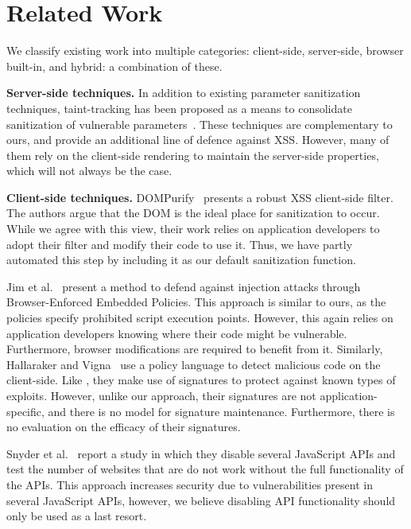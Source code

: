 \section{Related Work}
We classify existing work into multiple categories: client-side, server-side, browser built-in, and hybrid: a combination of these.

\noindent \textbf{Server-side techniques.}
In addition to existing parameter sanitization techniques,
taint-tracking has been proposed as a means to consolidate
sanitization of vulnerable parameters~\cite{Xu:2006:TPE:1267336.1267345,DBLP:conf/sec/Nguyen-TuongGGSE05,Pietraszek:2005:DAI:2146257.2146267,Bisht:2008:XPD:1428322.1428325}. These
techniques are complementary to ours, and provide an additional line
of defence against \ac{XSS}. However, many of them rely on the
client-side rendering to maintain the server-side properties, which
will not always be the case.

\noindent \textbf{Client-side techniques.}
DOMPurify~\cite{10.1007/978-3-319-66399-9_7} presents a robust
\ac{XSS} client-side filter. The authors
argue that the DOM is the ideal place for sanitization to occur. While
we agree with this view, their work relies on application developers
to adopt their filter and modify their code to use it. Thus, we have partly automated this step by including it as our default sanitization function.

Jim et al.~\cite{Jim:2007:DSI:1242572.1242654} present a method to
defend against injection attacks through Browser-Enforced Embedded
Policies. This approach is similar to ours, as the policies specify
prohibited script execution points. However, this again relies on application developers knowing where their code might be vulnerable. Furthermore, browser modifications are required to benefit from it. Similarly, Hallaraker and Vigna~\cite{Hallaraker:2005:DMJ:1078029.1078861} use a
policy language to detect malicious code on the client-side. Like \sys, they make use of signatures to protect against known types of
exploits. However, unlike our approach, their signatures are not
application-specific, and there is no model for signature
maintenance. Furthermore, there is no evaluation on the efficacy of
their signatures.

Snyder et al.~\cite{Snyder:2017:MWD:3133956.3133966} report a study in which
they disable several JavaScript APIs and test the number of websites
that are do not work without the full functionality of the APIs. This approach increases security due to vulnerabilities present in several
JavaScript APIs, however, we believe disabling API functionality
should only be used as a last resort.

